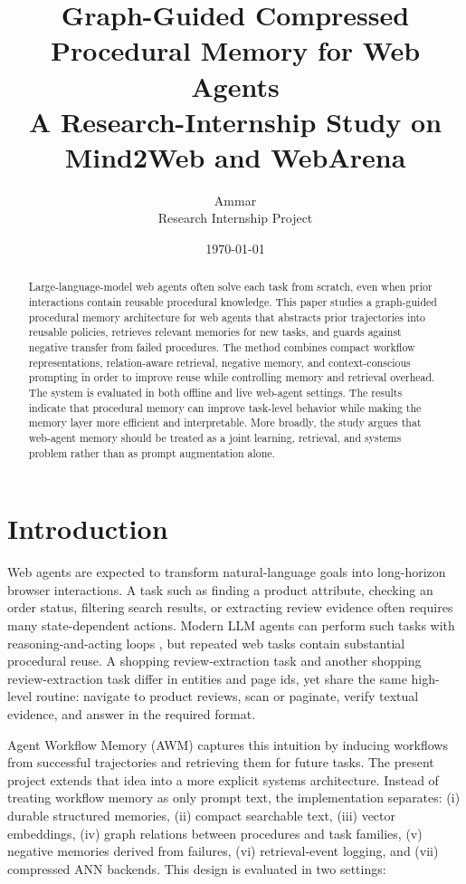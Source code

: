 \documentclass[11pt]{article}
\title{\textbf{Graph-Guided Compressed Procedural Memory for Web Agents}\\
\large A Research-Internship Study on Mind2Web and WebArena}
\author{Ammar\\
Research Internship Project}
\date{\today}
\begin{document}
\maketitle

\begin{abstract}
Large-language-model web agents often solve each task from scratch, even when prior interactions contain reusable procedural knowledge. This paper studies a graph-guided procedural memory architecture for web agents that abstracts prior trajectories into reusable policies, retrieves relevant memories for new tasks, and guards against negative transfer from failed procedures. The method combines compact workflow representations, relation-aware retrieval, negative memory, and context-conscious prompting in order to improve reuse while controlling memory and retrieval overhead. The system is evaluated in both offline and live web-agent settings. The results indicate that procedural memory can improve task-level behavior while making the memory layer more efficient and interpretable. More broadly, the study argues that web-agent memory should be treated as a joint learning, retrieval, and systems problem rather than as prompt augmentation alone.
\end{abstract}

\section{Introduction}

Web agents are expected to transform natural-language goals into long-horizon browser interactions. A task such as finding a product attribute, checking an order status, filtering search results, or extracting review evidence often requires many state-dependent actions. Modern LLM agents can perform such tasks with reasoning-and-acting loops \citep{yao2023react}, but repeated web tasks contain substantial procedural reuse. A shopping review-extraction task and another shopping review-extraction task differ in entities and page ids, yet share the same high-level routine: navigate to product reviews, scan or paginate, verify textual evidence, and answer in the required format.

Agent Workflow Memory (AWM) \citep{wang2024awm} captures this intuition by inducing workflows from successful trajectories and retrieving them for future tasks. The present project extends that idea into a more explicit systems architecture. Instead of treating workflow memory as only prompt text, the implementation separates: (i) durable structured memories, (ii) compact searchable text, (iii) vector embeddings, (iv) graph relations between procedures and task families, (v) negative memories derived from failures, (vi) retrieval-event logging, and (vii) compressed ANN backends. This design is evaluated in two settings:
\end{document}

